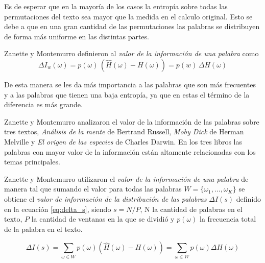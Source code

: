 
Es de esperar que en la mayoría de los casos 
la entropía sobre todas las permutaciones del texto sea mayor que la medida en el calculo original. Esto 
se debe a que en una gran cantidad de las permutaciones las palabras se distribuyen de forma más uniforme 
en las distintas partes.

Zanette y Montemurro definieron al \textit{valor de la información de una palabra} como
 \begin{equation}
  \Delta I_w(\omega) = p(\omega) \,  (\widehat{H}(\omega) - H(\omega))  =  p(w) \, \Delta{H(\omega)}
 \end{equation}
 
De esta manera se les da más importancia a las palabras que son más frecuentes y a las palabras que tienen una baja entropía, ya que en estas el término de la diferencia es más grande.

Zanette y Montemurro analizaron el valor de la información de las palabras sobre tres textos, \textit{Análisis de la mente} de Bertrand Russell, 
\textit{Moby Dick} de Herman Melville y \textit{El origen de las especies} de Charles Darwin. 
En los tres libros las palabras con mayor valor de la información están 
altamente relacionadas con los temas principales. 


Zanette y Montemurro utilizaron el \textit{valor de la información de una palabra} de manera tal que sumando el valor para todas las palabras $W = \{\omega_1,\dots,\omega_K\}$ se obtiene el \textit{valor de información de la distribución de las palabras} $\Delta I(s)$ definido en la ecuación \ref{eq:delta_s}, siendo  $s = N/P$, N la cantidad de palabras en el texto, $P$ la cantidad de ventanas en la que se dividió y $p(\omega)$ la frecuencia total de la palabra en el texto.

\begin{equation}
  \Delta I(s) = \sum\limits_{\omega \in W } p(\omega) (\widehat{H}(\omega) - H(\omega)) = \sum\limits_{\omega \in W } p(\omega) \Delta H(\omega) 
  \label{eq:delta_s}
\end{equation}

